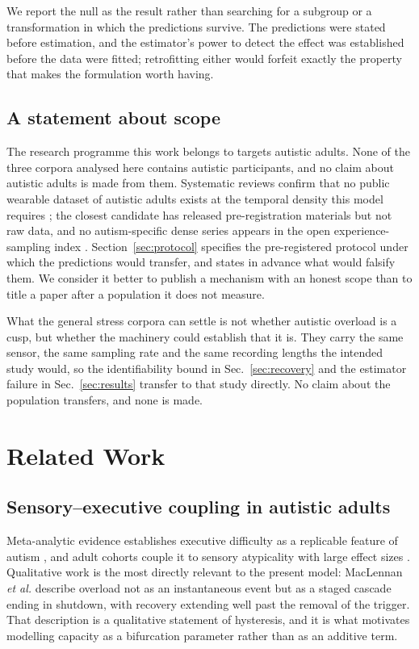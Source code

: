 \documentclass[conference]{IEEEtran}
\begin{document}
We report the null as the result rather than searching for a subgroup or a
transformation in which the predictions survive. The predictions were stated
before estimation, and the estimator's power to detect the effect was
established before the data were fitted; retrofitting either would forfeit
exactly the property that makes the formulation worth having.

\subsection*{A statement about scope}

The research programme this work belongs to targets autistic adults. None of
the three corpora analysed here contains autistic participants, and no claim
about autistic adults is made from them. Systematic reviews confirm that no
public wearable dataset of autistic adults exists at the temporal density this
model requires \cite{cano2024,chen2025ema}; the closest candidate
\cite{scheeren2025} has released pre-registration materials but not raw data,
and no autism-specific dense series appears in the open experience-sampling
index \cite{siepe2026}.
Section~\ref{sec:protocol} specifies the pre-registered protocol under which
the predictions would transfer, and states in advance what would falsify them.
We consider it better to publish a mechanism with an honest scope than to title
a paper after a population it does not measure.

What the general stress corpora can settle is not whether autistic overload is
a cusp, but whether the machinery could establish that it is. They carry the
same sensor, the same sampling rate and the same recording lengths the intended
study would, so the identifiability bound in Sec.~\ref{sec:recovery} and the
estimator failure in Sec.~\ref{sec:results} transfer to that study directly.
No claim about the population transfers, and none is made.

\section{Related Work}

\subsection{Sensory--executive coupling in autistic adults}
Meta-analytic evidence establishes executive difficulty as a replicable feature
of autism \cite{demetriou2018,demetriou2019}, and adult cohorts couple it to
sensory atypicality with large effect sizes \cite{kiep2025,auge2025}.
Qualitative work is the most directly relevant to the present model:
MacLennan \emph{et al.} \cite{maclennan2022} describe overload not as an
instantaneous event but as a staged cascade ending in shutdown, with recovery
extending well past the removal of the trigger. That description is a
qualitative statement of hysteresis, and it is what motivates modelling
capacity as a bifurcation parameter rather than as an additive term.
\end{document}
